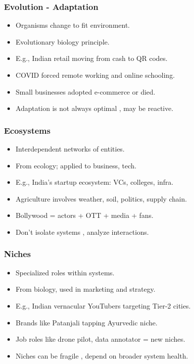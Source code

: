 \begin{frame}[fragile]\frametitle{Evolution - Adaptation}
  \begin{itemize}
    \item Organisms change to fit environment.
    \item Evolutionary biology principle.
    \item E.g., Indian retail moving from cash to QR codes.
    \item COVID forced remote working and online schooling.
    \item Small businesses adopted e-commerce or died.
    \item Adaptation is not always optimal , may be reactive.
  \end{itemize}
\end{frame}

\begin{frame}[fragile]\frametitle{Ecosystems}
  \begin{itemize}
    \item Interdependent networks of entities.
    \item From ecology; applied to business, tech.
    \item E.g., India's startup ecosystem: VCs, colleges, infra.
    \item Agriculture involves weather, soil, politics, supply chain.
    \item Bollywood = actors + OTT + media + fans.
    \item Don't isolate systems , analyze interactions.
  \end{itemize}
\end{frame}

\begin{frame}[fragile]\frametitle{Niches}
  \begin{itemize}
    \item Specialized roles within systems.
    \item From biology, used in marketing and strategy.
    \item E.g., Indian vernacular YouTubers targeting Tier-2 cities.
    \item Brands like Patanjali tapping Ayurvedic niche.
    \item Job roles like drone pilot, data annotator = new niches.
    \item Niches can be fragile , depend on broader system health.
  \end{itemize}
\end{frame}

